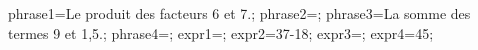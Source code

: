 \documentclass[exercice]{thedocument}%
\begin{document}
%
    \>phrase1=Le produit des facteurs 6 et 7.;%
    \>phrase2=;%
    \>phrase3=La somme des termes 9 et 1,5.;%
    \>phrase4=;%
    \>expr1=;%
    \>expr2=37-18;%
    \>expr3=;%
    \>expr4=45;%
\end{document}
